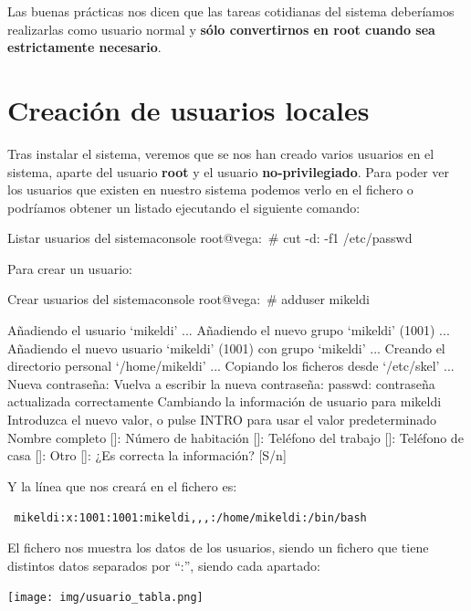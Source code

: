 \documentclass{../../../yukibook.cls/yukibook}
\begin{document}
Las buenas prácticas nos dicen que las tareas cotidianas del sistema deberíamos realizarlas como usuario normal y \textbf{sólo convertirnos en root cuando sea estrictamente necesario}.

\section{Creación de usuarios locales}

Tras instalar el sistema, veremos que se nos han creado varios usuarios en el sistema, aparte del usuario \textbf{root} y el usuario \textbf{no-privilegiado}. Para poder ver los usuarios que existen en nuestro sistema podemos verlo en el fichero    o podríamos obtener un listado ejecutando el siguiente comando:

\begin{mycode}{Listar usuarios del sistema}{console}{}
root@vega:~# cut -d: -f1 /etc/passwd
\end{mycode}

Para crear un usuario:

\begin{mycode}{Crear usuarios del sistema}{console}{\small}
root@vega:~# adduser mikeldi

Añadiendo el usuario `mikeldi' ...
Añadiendo el nuevo grupo `mikeldi' (1001) ...
Añadiendo el nuevo usuario `mikeldi' (1001) con grupo `mikeldi' ...
Creando el directorio personal `/home/mikeldi' ...
Copiando los ficheros desde `/etc/skel' ...
Nueva contraseña:
Vuelva a escribir la nueva contraseña:
passwd: contraseña actualizada correctamente
Cambiando la información de usuario para mikeldi
Introduzca el nuevo valor, o pulse INTRO para usar el valor predeterminado
    Nombre completo []:
    Número de habitación []:
    Teléfono del trabajo []:
    Teléfono de casa []:
    Otro []:
¿Es correcta la información? [S/n]
\end{mycode}

Y la línea que nos creará en el fichero     es:
\begin{tcolorbox}[colback=white,title=Ejemplo de usaurio en “/etc/passwd”]
 \texttt{ mikeldi:x:1001:1001:mikeldi,,,:/home/mikeldi:/bin/bash }
\end{tcolorbox}

El fichero   nos muestra los datos de los usuarios, siendo un fichero que tiene distintos datos separados por “:”, siendo cada apartado:

\begin{center}
  \texttt{[image: img/usuario\_tabla.png]}
\end{center}
\end{document}
